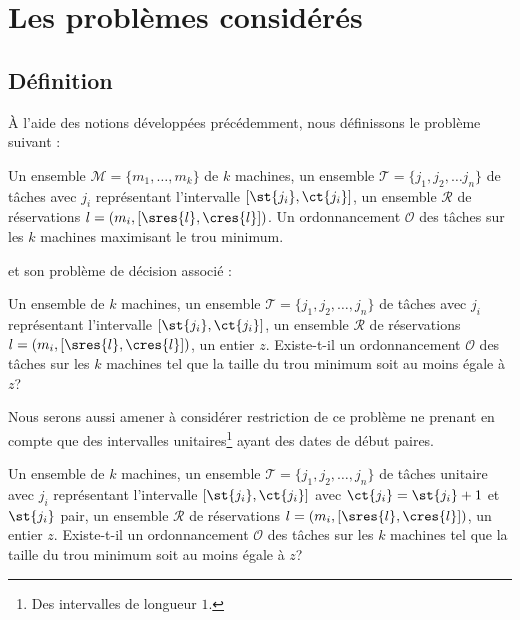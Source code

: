 \documentclass[a4paper,9pt]{report}
\begin{document}
\section{Les problèmes considérés}

\subsection{Définition}
\label{def_pb}

À l'aide des notions développées précédemment, nous définissons le problème suivant :

\dfopt{\fisched}
{Un ensemble $\mathcal{M} = \{m_1, \dots, m_k\}$ de $k$ machines, un ensemble $\mathcal{T} = \{j_1,
    j_2, \dots j_n\}$ de tâches avec $j_i$ représentant l'intervalle $[\st{j_i}, \ct{j_i}]$, un
ensemble $\mathcal{R}$ de réservations $l = (m_i, [\sres{l}, \cres{l}])$.} 
{Un ordonnancement $\mathcal{O}$ des tâches sur les $k$ machines maximisant le trou
minimum.}

et son problème de décision associé :

\dfdec{\fischedpi}
{Un ensemble de $k$ machines, un ensemble $\mathcal{T} = \{j_1, j_2, \dots, j_n\}$ de tâches avec
    $j_i$ représentant l'intervalle $[\st{j_i}, \ct{j_i}]$, un ensemble $\mathcal{R}$ de
réservations $l = (m_i, [\sres{l}, \cres{l}])$, un entier $z$.}
{Existe-t-il un ordonnancement $\mathcal{O}$ des tâches sur les $k$ machines tel que la taille du
trou minimum soit au moins égale à $z$?}

Nous serons aussi amener à considérer restriction de ce problème ne prenant en compte que des
intervalles unitaires\footnote{Des intervalles de longueur $1$.} ayant des dates de début paires.

\dfdec[unitfischedpi]{\unitfischedpi}
{Un ensemble de $k$ machines, un ensemble $\mathcal{T} = \{j_1, j_2, \dots, j_n\}$ de tâches
unitaire avec $j_i$ représentant l'intervalle $[\st{j_i}, \ct{j_i}]$ avec $\ct{j_i} = \st{j_i} +
1$ et $\st{j_i}$ pair, un ensemble $\mathcal{R}$ de réservations $l = (m_i, [\sres{l}, \cres{l}])$,
un entier $z$.}
{Existe-t-il un ordonnancement $\mathcal{O}$ des tâches sur les $k$ machines tel que la taille du
trou minimum soit au moins égale à $z$?}
\end{document}

